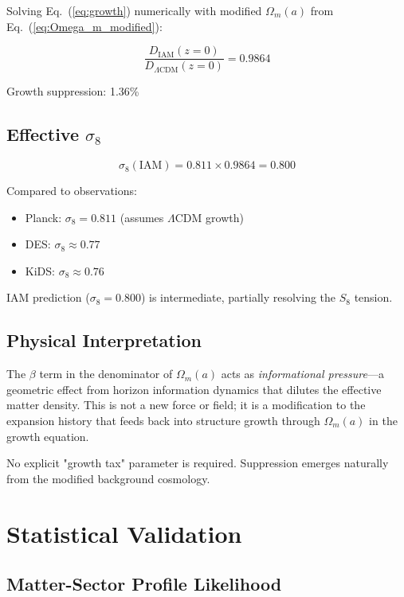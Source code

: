\documentclass[twocolumn,superscriptaddress,prl,amsmath,amssymb]{revtex4-2}
\begin{document}
Solving Eq.~(\ref{eq:growth}) numerically with modified $\Omega_m(a)$ from Eq.~(\ref{eq:Omega_m_modified}):

\begin{equation}
\frac{D_{\text{IAM}}(z=0)}{D_{\Lambda\text{CDM}}(z=0)} = 0.9864
\end{equation}

Growth suppression: 1.36\%

\subsection{Effective $\sigma_8$}

\begin{equation}
\sigma_8(\text{IAM}) = 0.811 \times 0.9864 = 0.800
\end{equation}

Compared to observations:
\begin{itemize}
\item Planck: $\sigma_8 = 0.811$ (assumes $\Lambda$CDM growth)
\item DES: $\sigma_8 \approx 0.77$~\cite{DES2022}
\item KiDS: $\sigma_8 \approx 0.76$~\cite{KiDS2020}
\end{itemize}

IAM prediction ($\sigma_8 = 0.800$) is intermediate, partially resolving the $S_8$ tension.

\subsection{Physical Interpretation}

The $\beta$ term in the denominator of $\Omega_m(a)$ acts as \textit{informational pressure}---a geometric effect from horizon information dynamics that dilutes the effective matter density. This is not a new force or field; it is a modification to the expansion history that feeds back into structure growth through $\Omega_m(a)$ in the growth equation.

No explicit "growth tax" parameter is required. Suppression emerges naturally from the modified background cosmology.

\section{Statistical Validation}

\subsection{Matter-Sector Profile Likelihood}
\end{document}
